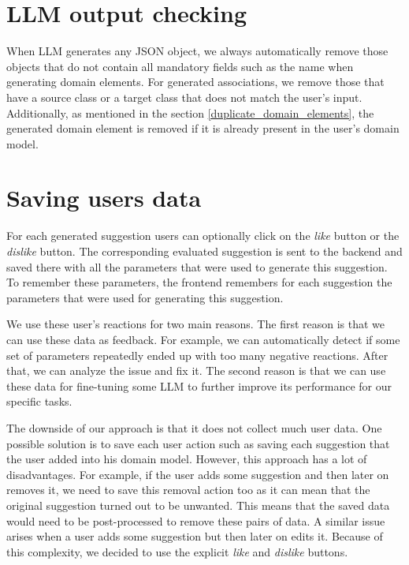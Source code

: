 \section{LLM output checking}

When LLM generates any JSON object, we always automatically remove those objects that do not contain all mandatory fields such as the name when generating domain elements. For generated associations, we remove those that have a source class or a target class that does not match the user's input. Additionally, as mentioned in the section \ref{duplicate_domain_elements}, the generated domain element is removed if it is already present in the user's domain model.



\section{Saving users data}

For each generated suggestion users can optionally click on the \textit{like} button or the \textit{dislike} button. The corresponding evaluated suggestion is sent to the backend and saved there with all the parameters that were used to generate this suggestion. To remember these parameters, the frontend remembers for each suggestion the parameters that were used for generating this suggestion.

We use these user's reactions for two main reasons. The first reason is that we can use these data as feedback. For example, we can automatically detect if some set of parameters repeatedly ended up with too many negative reactions. After that, we can analyze the issue and fix it. The second reason is that we can use these data for fine-tuning some LLM to further improve its performance for our specific tasks.

The downside of our approach is that it does not collect much user data. One possible solution is to save each user action such as saving each suggestion that the user added into his domain model. However, this approach has a lot of disadvantages. For example, if the user adds some suggestion and then later on removes it, we need to save this removal action too as it can mean that the original suggestion turned out to be unwanted. This means that the saved data would need to be post-processed to remove these pairs of data. A similar issue arises when a user adds some suggestion but then later on edits it. Because of this complexity, we decided to use the explicit \emph{like} and \emph{dislike} buttons.


